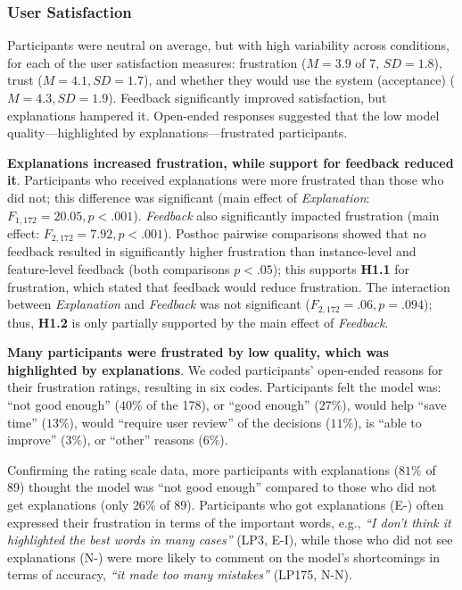 \subsubsection{User Satisfaction}
Participants were neutral on average, but with high variability across conditions, for each of the user satisfaction measures: frustration ($M=3.9$ of 7, $SD=1.8$), trust ($M=4.1, SD=1.7$), and whether they would use the system (acceptance) ($M=4.3, SD=1.9$).
%
Feedback significantly improved satisfaction, but explanations hampered it. Open-ended responses suggested that the low model quality---highlighted by explanations---frustrated participants.

\textbf{Explanations increased frustration, while support for feedback reduced it}. 
%
Participants who received explanations were more frustrated than those who did not; this difference was significant (main effect of \textit{Explanation}: $F_{1, 172}=20.05, p < .001$). \textit{Feedback} also significantly impacted frustration (main effect: $F_{2, 172}=7.92, p < .001$). Posthoc pairwise comparisons showed that no feedback resulted in significantly higher frustration than instance-level and feature-level feedback (both comparisons $p<.05$); this supports \textbf{H1.1} for frustration, which stated that feedback would reduce frustration. The interaction between \textit{Explanation} and \textit{Feedback} was not significant ($F_{2, 172}=.06, p=.094$); thus, \textbf{H1.2} is only partially supported by the main effect of \textit{Feedback}. 

\textbf{Many participants were frustrated by low quality, which was highlighted by explanations}.
%
We coded participants' open-ended reasons for their frustration ratings, resulting in six codes. Participants felt the model was: ``not good enough'' ($40\%$ of the 178), or ``good enough'' ($27\%$), would help ``save time'' ($13\%$), would ``require user review'' of the decisions ($11\%$), is ``able to improve'' ($3\%$), or ``other'' reasons ($6\%$).

Confirming the rating scale data, more participants with explanations ($81\%$ of 89) thought the model was ``not good enough'' compared to those who did not get explanations (only $26\%$ of 89).
%
Participants who got explanations (E-) often expressed their frustration in terms of the important words, e.g., \textit{``I don't think it highlighted the best words in many cases''} (LP3, E-I), while those who did not see explanations (N-) were more likely to comment on the model's shortcomings in terms of accuracy, \textit{``it made too many mistakes''} (LP175, N-N). 
%

